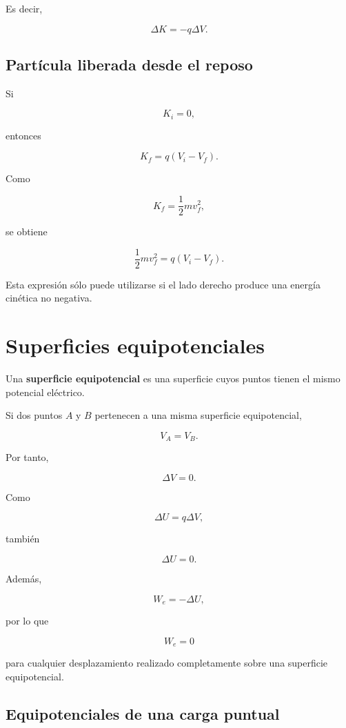 Es decir,

\begin{equation}
\boxed{
\Delta K=-q\Delta V
}.
\end{equation}


\subsection{Partícula liberada desde el reposo}

Si

\[
K_i=0,
\]

entonces

\[
K_f=q(V_i-V_f).
\]

Como

\[
K_f=\frac12mv_f^2,
\]

se obtiene

\begin{equation}
\boxed{
\frac12mv_f^2
=
q(V_i-V_f)
}.
\end{equation}

Esta expresión sólo puede utilizarse si el lado derecho produce una energía cinética
no negativa.


\section{Superficies equipotenciales}

Una \textbf{superficie equipotencial} es una superficie cuyos puntos tienen el mismo
potencial eléctrico.

Si dos puntos \(A\) y \(B\) pertenecen a una misma superficie equipotencial,

\[
V_A=V_B.
\]

Por tanto,

\[
\boxed{\Delta V=0}.
\]

Como

\[
\Delta U=q\Delta V,
\]

también

\[
\boxed{\Delta U=0}.
\]

Además,

\[
W_e=-\Delta U,
\]

por lo que

\begin{equation}
\boxed{
W_e=0
}
\end{equation}

para cualquier desplazamiento realizado completamente sobre una superficie
equipotencial.


\subsection{Equipotenciales de una carga puntual}

